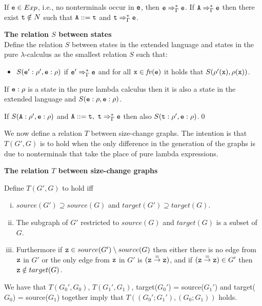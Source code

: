 \documentclass{LMCS}
\newcommand{\bi}{\begin{itemize}}
\newcommand{\ei}{\end{itemize}}
\newcommand{\be}{\begin{enumerate}}
\newcommand{\ee}{\end{enumerate}}
\newcommand{\bdfn}{\begin{defi}}
\newcommand{\edfn}{\end{defi}}
\newcommand{\blem}{\begin{lem}}
\newcommand{\elem}{\end{lem}}
\theoremstyle{definition}\newtheorem{env}[thm]{Environment}
\begin{document}
If ${\tt e}\in Exp$, i.e., no nonterminals occur in ${\tt e}$, then
${\tt e}\Rightarrow^*_\Gamma {\tt e}$.  If ${\tt
A}\Rightarrow^*_\Gamma {\tt e}$ then there exist ${\tt t}\notin N$
such that ${\tt A}::={\tt t}$ and ${\tt t}\Rightarrow^*_\Gamma {\tt
e}$.



\bdfn \textbf{The relation $S$ between states}\\
Define the relation $S$ between states in the extended language and states in the pure $\lambda$-calculus as the smallest relation $S$ such that: 
\bi
\item[]$S({\tt e}':\rho',{\tt e}:\rho)$ if ${\tt e}'\Rightarrow^*_\Gamma {\tt e}$ and for all ${\tt x}\in \mathit{fv}({\tt e})$ it holds that $S(\rho'({\tt x}),\rho({\tt x}))$.
\ei
\edfn

If ${\tt e}:\rho$ is a state in the pure lambda calculus then it is also a state in the extended language and $S({\tt e}:\rho,{\tt e}:\rho)$.

\blem \label{push-S}
If $S({\tt A}:\rho',{\tt e}:\rho)$ and ${\tt A}::= {\tt t},\ {\tt t}\Rightarrow_\Gamma^* {\tt e} $ then also $S({\tt t}:\rho',{\tt e}:\rho)$.\qed
\elem

We now define a relation $T$ between size-change graphs. The intention is that $T(G',G)$ is to hold when the only difference in the generation of the graphs is due to nonterminals that take the place of pure lambda expressions.
\bdfn \textbf{The relation $T$ between size-change graphs}

Define $T(G',G)$ to hold iff 
\be[i)]
\item $source(G')\supseteq source(G)$ and $target(G')\supseteq target(G)$.
\item The subgraph of $G'$ restricted to $source(G)$ and $target(G)$ is a subset of $G$.
\item Furthermore if ${\tt z}\in source(G')\setminus source(G)$ then either there is no edge from ${\tt z}$ in $G'$ or the only edge from ${\tt z}$ in $G'$ is 
$({\tt z}\stackrel{=}{\to}{\tt z})$, and if $({\tt z}\stackrel{=}{\to}{\tt z})\in G'$ then ${\tt z}\notin target(G)$. 
\ee
\edfn

\noindent We have that $T(G_0',G_0)$, $T(G_1',G_1)$, target($G_0'$) = source($G_1'$) and target($G_0$) = source($G_1$) together imply  that $ T((G_0';G_1'),(G_0;G_1))$ holds.
\end{document}

